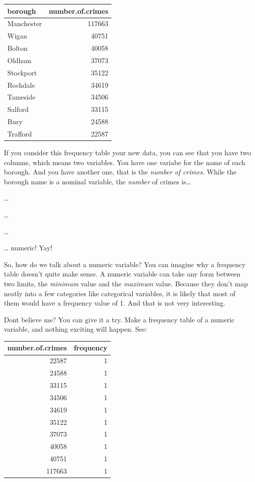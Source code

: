 \documentclass[
]{book}
\begin{document}
\begin{tabular}{l|r}
\hline
borough & number.of.crimes\\
\hline
Manchester & 117663\\
\hline
Wigan & 40751\\
\hline
Bolton & 40058\\
\hline
Oldham & 37073\\
\hline
Stockport & 35122\\
\hline
Rochdale & 34619\\
\hline
Tameside & 34506\\
\hline
Salford & 33115\\
\hline
Bury & 24588\\
\hline
Trafford & 22587\\
\hline
\end{tabular}

If you consider this frequency table your new data, you can see that you have two columns, which means two variables. You have one variabe for the name of each borough. And you have another one, that is the \emph{number of crimes}. While the borough name is a nominal variable, the \emph{number} of crimes is\ldots{}

\ldots{}

\ldots{}

\ldots{}

\ldots{} numeric! Yay!

So, how do we talk about a numeric variable? You can imagine why a frequency table doesn't quite make sense. A numeric variable can take any form between two limits, the \emph{minimum} value and the \emph{maximum} value. Because they don't map neatly into a few categories like categorical variables, it is likely that most of them would have a frequency value of 1. And that is not very interesting.

Dont believe me? You can give it a try. Make a frequency table of a numeric variable, and nothing exciting will happen. See:

\begin{tabular}{r|r}
\hline
number.of.crimes & frequency\\
\hline
22587 & 1\\
\hline
24588 & 1\\
\hline
33115 & 1\\
\hline
34506 & 1\\
\hline
34619 & 1\\
\hline
35122 & 1\\
\hline
37073 & 1\\
\hline
40058 & 1\\
\hline
40751 & 1\\
\hline
117663 & 1\\
\hline
\end{tabular}
\end{document}

